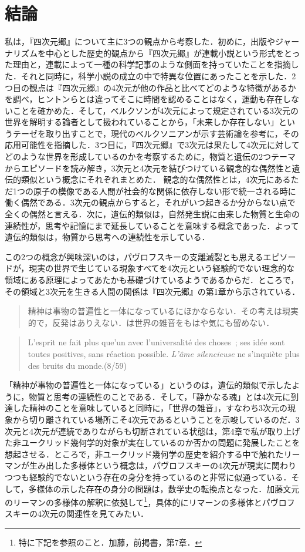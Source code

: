 \chapter{結論}
私は，『四次元郷』について主に3つの観点から考察した．初めに，出版やジャーナリズムを中心とした歴史的観点から『四次元郷』が連載小説という形式をとった理由と，連載によって一種の科学記事のような側面を持っていたことを指摘した．それと同時に，科学小説の成立の中で特異な位置にあったことを示した．2つ目の観点は『四次元郷』の4次元が他の作品と比べてどのような特徴があるかを調べ，ヒントンらとは違ってそこに時間を認めることはなく，運動も存在しないことを確かめた．そして，ベルクソンが4次元によって規定されている3次元の世界を解明する論者として扱われていることから，「未来しか存在しない」というテーゼを取り出すことで，現代のベルクソニアンが示す芸術論を参考に，その応用可能性を指摘した．3つ目に，『四次元郷』で3次元は果たして4次元に対してどのような世界を形成しているのかを考察するために，物質と遺伝の2つテーマからエピソードを読み解き，3次元と4次元を結びつけている観念的な偶然性と遺伝的類似という概念にそれぞれまとめた． 観念的な偶然性とは，4次元にあるただ1つの原子の模像である人間が社会的な関係に依存しない形で統一される時に働く偶然である．3次元の観点からすると，それがいつ起きるか分からない点で全くの偶然と言える．次に，遺伝的類似は，自然発生説に由来した物質と生命の連続性が，思考や記憶にまで延長していることを意味する概念であった．よって遺伝的類似は，物質から思考への連続性を示している．

この2つの概念が興味深いのは，パヴロフスキーの支離滅裂とも思えるエピソードが，現実の世界で生じている現象すべてを4次元という経験的でない理念的な領域にある原理によってあたかも基礎づけているようであるからだ．ところで，その領域と3次元を生きる人間の関係は『四次元郷』の第1章から示されている．
\begin{quote}
精神は事物の普遍性と一体になっているにほかならない．その考えは現実的で，反発はありえない．は世界の雑音をもはや気にも留めない．
\end{quote}
\begin{quote}
L'esprit ne fait plus que'un avec l'universalité des choses~; ses idée sont toutes positives, sans réaction possible. \emph{L'âme silencieuse} ne s'inquiète plus des bruits du monde.(8/59)
\end{quote}
「精神が事物の普遍性と一体になっている」というのは，遺伝的類似で示したように，物質と思考の連続性のことである．そして，「静かなる魂」とは4次元に到達した精神のことを意味していると同時に，「世界の雑音」，すなわち3次元の現象から切り離されている場所こそ4次元であるということを示唆しているのだ．3次元と4次元が連続でありながらも切断されている状態は，第4章で私が取り上げた非ユークリッド幾何学的対象が実在しているのか否かの問題に発展したことを想起させる．ところで，非ユークリッド幾何学の歴史を紹介する中で触れたリーマンが生み出した多様体という概念は，パヴロフスキーの4次元が現実に関わりつつも経験的でないという存在の身分を持っているのと非常に似通っている．そして，多様体の示した存在の身分の問題は，数学史の転換点となった．加藤文元のリーマンの多様体の解釈に依拠して\footnote{特に下記を参照のこと．加藤，前掲書，第7章．}，具体的にリマーンの多様体とパヴロフスキーの4次元の関連性を見てみたい．

